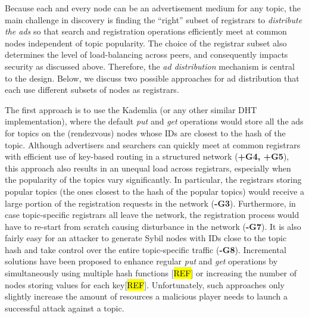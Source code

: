 Because each and every node can be an advertisement medium for any topic, the main challenge in discovery is finding the ``right'' subset of registrars to \textit{distribute the ads} so that search and registration operations efficiently meet at common nodes independent of topic popularity. The choice of the registrar subset also determines the level of load-balancing across peers, and consequently impacts security as discussed above. Therefore, the \textit{ad distribution} mechanism is central to the \sysname design. Below, we discuss two possible approaches for ad distribution that each use different subsets of nodes as registrars.


The first approach is to use the Kademlia (or any other similar DHT implementation), where the default \emph{put} and \emph{get} operations would store all the ads for topics on the (rendezvous) nodes whose IDs are closest to the hash of the topic. Although advertisers and searchers can quickly meet at common registrars with efficient use of key-based routing in a structured network (\textbf{+G4, +G5}), this approach also results in an unequal load across registrars, especially when the popularity of the topics vary significantly. In particular, the registrars storing popular topics (\ie the ones closest to the hash of the popular topics) would receive a large portion of the registration requests in the network (\textbf{-G3}). Furthermore, in case topic-specific registrars all leave the network, the registration process would have to re-start from scratch causing disturbance in the network (\textbf{-G7}). It is also fairly easy for an attacker to generate Sybil nodes with IDs close to the topic hash and take control over the entire topic-specific traffic (\textbf{-G8}). Incremental solutions have been  proposed to enhance regular \emph{put} and \emph{get} operations by simultaneously using multiple hash functions [\hl{REF}] or increasing the number of nodes storing values for each key[\hl{REF}]. Unfortunately, such approaches only slightly increase the amount of resources a malicious player needs to launch a successful attack against a topic.

